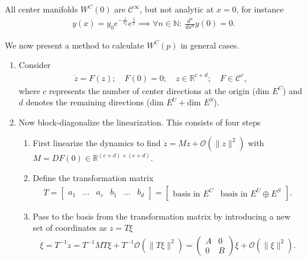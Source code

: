 \begin{ex}
	\begin{remark}[]
		All center manifolds $W^{C}(0)$ are $\mathcal{C}^{\infty }$, but not analytic at $x=0$, for instance
		\begin{align}
			y(x) = y_0 e^{-\frac{1}{x_0}}e^{\frac{1}{x}} \implies \forall n \in \mathbb{N}:\ \frac{d^{n}}{dx^{n}}y(0) = 0.
		\end{align}
		
	\end{remark}
	
\end{ex}

We now present a method to calculate $W^C(p)$ in general cases.
\begin{enumerate}
	\item Consider 
		\begin{align}
			\dot{z} = F(z); \quad F(0) = 0;\quad z \in \mathbb{R}^{c+d};\quad F \in \mathcal{C}^{r},
		\end{align}
	where $c$ represents the number of center directions at the origin ($ \textrm{dim }E^{C}$) and $d$ denotes the remaining directions ($ \textrm{dim } E^{U} +  \textrm{dim } E^{S}$).
	\item Now block-diagonalize the linearization. This consists of four steps
		\begin{enumerate}
			\item First linearize the dynamics to find $\dot{z} = Mz + \mathcal{O}(\|z\|^2)$ with $M = DF(0) \in \mathbb{R}^{(c+d) \times (c+d)}$.
			\item Define the transformation matrix
				\begin{align}
					T=
					\begin{bmatrix}
						a_1 & \ldots & a_c & b_1 & \ldots & b_d	
					\end{bmatrix}
				=
				\begin{bmatrix}
					\textrm{basis in } E^{C} &  \textrm{basis in } E^{U} \oplus E^{S}
				\end{bmatrix}
				.
				\end{align}
			\item Pass to the basis from the transformation matrix by introducing a new set of coordinates as $z = T \xi$
				\begin{align}
					\dot{\xi} = T^{-1}\dot{z} = T^{-1}MT \xi + T^{-1}\mathcal{O}(\| T\xi\|^2) = 
					\begin{pmatrix}
						A & 0 \\
						0 & B
					\end{pmatrix}
					\xi + \mathcal{O}(\| \xi \| ^2).

\end{align}
\end{enumerate}
\end{enumerate}
